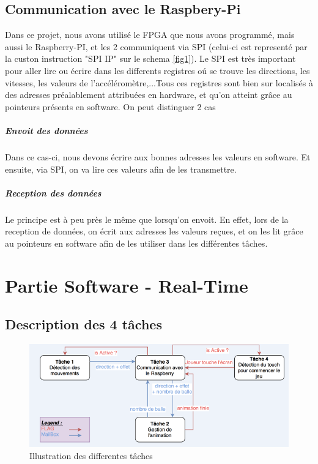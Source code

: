 \section{Communication avec le Raspbery-Pi}

Dans ce projet, nous avons utilisé le FPGA que nous avons programmé, mais aussi le Raspberry-PI, et les 2 communiquent via SPI (celui-ci est representé par la custon instruction "SPI IP" sur le schema \ref{fig1}). Le SPI est très important pour aller lire ou écrire dans les differents registres oú se trouve les directions, les vitesses, les valeurs de l'accéléromètre,...Tous ces registres sont bien sur localisés à des adresses préalablement attribuées en hardware, et qu'on atteint grâce au pointeurs présents en software. On peut distinguer 2 cas

\paragraph{Envoit des données}

Dans ce cas-ci, nous devons écrire aux bonnes adresses les valeurs en software. Et ensuite, via SPI, on va lire ces valeurs afin de les transmettre.

\paragraph{Reception des données}

Le principe est à peu près le même que lorsqu'on envoit. En effet, lors de la reception de données, on écrit aux adresses les valeurs reçues, et on les lit grâce au pointeurs en software afin de les utiliser dans les différentes tâches.


\chapter{Partie Software - Real-Time}

\section{Description des 4 tâches}

\begin{figure}[!ht]
\centering
\includegraphics[scale=0.7]{task.png}
\caption{Illustration des differentes tâches}
\label{fig8}
\end{figure}

